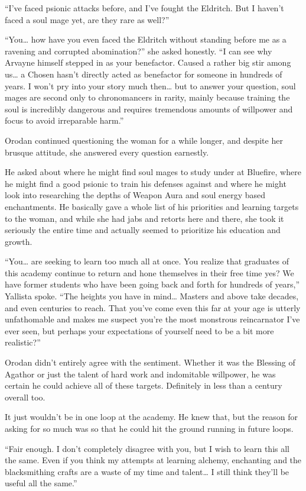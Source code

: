 \documentclass[a4paper,10pt]{book}
\begin{document}
“I’ve faced psionic attacks before, and I’ve fought the Eldritch. But I haven’t faced a soul mage yet, are they rare as well?”\par
“You… how have you even faced the Eldritch without standing before me as a ravening and corrupted abomination?” she asked honestly. “I can see why Arvayne himself stepped in as your benefactor. Caused a rather big stir among us… a Chosen hasn’t directly acted as benefactor for someone in hundreds of years. I won’t pry into your story much then… but to answer your question, soul mages are second only to chronomancers in rarity, mainly because training the soul is incredibly dangerous and requires tremendous amounts of willpower and focus to avoid irreparable harm.”\par
Orodan continued questioning the woman for a while longer, and despite her brusque attitude, she answered every question earnestly.\par
He asked about where he might find soul mages to study under at Bluefire, where he might find a good psionic to train his defenses against and where he might look into researching the depths of Weapon Aura and soul energy based enchantments. He basically gave a whole list of his priorities and learning targets to the woman, and while she had jabs and retorts here and there, she took it seriously the entire time and actually seemed to prioritize his education and growth.\par
“You… are seeking to learn too much all at once. You realize that graduates of this academy continue to return and hone themselves in their free time yes? We have former students who have been going back and forth for hundreds of years,” Yallista spoke. “The heights you have in mind… Masters and above take decades, and even centuries to reach. That you’ve come even this far at your age is utterly unfathomable and makes me suspect you’re the most monstrous reincarnator I’ve ever seen, but perhaps your expectations of yourself need to be a bit more realistic?”\par
Orodan didn’t entirely agree with the sentiment. Whether it was the Blessing of Agathor or just the talent of hard work and indomitable willpower, he was certain he could achieve all of these targets. Definitely in less than a century overall too.\par
It just wouldn’t be in one loop at the academy. He knew that, but the reason for asking for so much was so that he could hit the ground running in future loops.\par
“Fair enough. I don’t completely disagree with you, but I wish to learn this all the same. Even if you think my attempts at learning alchemy, enchanting and the blacksmithing crafts are a waste of my time and talent… I still think they’ll be useful all the same.”\par
\end{document}
